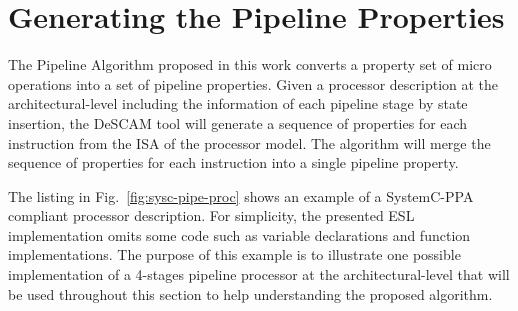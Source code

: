 \section{Generating the Pipeline Properties}
\label{section:pipe-algorithm}

The Pipeline Algorithm proposed in this work converts a property set of micro operations into a set of pipeline properties. Given a processor description at the architectural-level including the information of each pipeline stage by state insertion, the DeSCAM tool will generate a sequence of properties for each instruction from the ISA of the processor model. The algorithm will merge the sequence of properties for each instruction into a single pipeline property. 

The listing in Fig.~\ref{fig:sysc-pipe-proc} shows an example of a SystemC-PPA compliant processor description. For simplicity, the presented ESL implementation omits some code such as variable declarations and function implementations. The purpose of this example is to illustrate one possible implementation of a 4-stages pipeline processor at the architectural-level that will be used throughout this section to help understanding the proposed algorithm.

